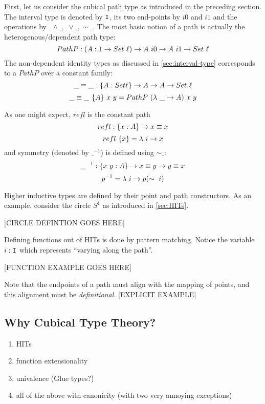 First, let us consider the cubical path type as introduced in the preceding
section. The interval type is denoted by $\texttt{I}$, its two end-points by $i0$ and
$i1$ and the operations by $\_\land\_, \_\lor\_, \sim\_$. The most basic notion
of a path is actually the heterogenous/dependent path type:
\[PathP : (A : \texttt{I} \rightarrow Set~\ell) \rightarrow A~i0 \rightarrow A~i1 \rightarrow Set~\ell\]
The non-dependent identity types as discussed in \autoref{sec:interval-type}
corresponds to a $PathP$ over a constant family:
\[
  \_\equiv\_ : \{A : Set \ell\} \rightarrow A \rightarrow A \rightarrow Set~\ell
\] \[
  \_\equiv\_~\{A\}~x~y = PathP~(\lambda~\_ \rightarrow A)~x~y
\]

As one might expect, $refl$ is the constant path
\[
  refl : \{x : A\} \rightarrow x \equiv x
\] \[
  refl~\{x\} = \lambda~i \rightarrow x
\]
and symmetry (denoted by $\_^{-1}$) is defined using $\sim\_$:
\[
  \_^{-1} : \{x~y : A\} \rightarrow x \equiv y \rightarrow y \equiv x
\] \[
  p^{-1} = \lambda~i \rightarrow p(\sim~i)
\]

Higher inductive types are defined by their point and path constructors. As an
example, consider the circle $S^1$ as introduced in \autoref{sec:HITs}.

[CIRCLE DEFINTION GOES HERE]

Defining functions out of HITs is done by pattern matching. Notice the variable
$i:\texttt{I}$ which represents ``varying along the path''.

[FUNCTION EXAMPLE GOES HERE]

Note that the endpoints of a path must align with the mapping of points, and
this alignment must be \emph{definitional}. [EXPLICIT EXAMPLE]

\subsection{Why Cubical Type Theory?}
\begin{enumerate}
  \item HITs
  \item function extensionality
  \item univalence (Glue types?)
  \item all of the above with canonicity (with two very annoying exceptions)
\end{enumerate}
